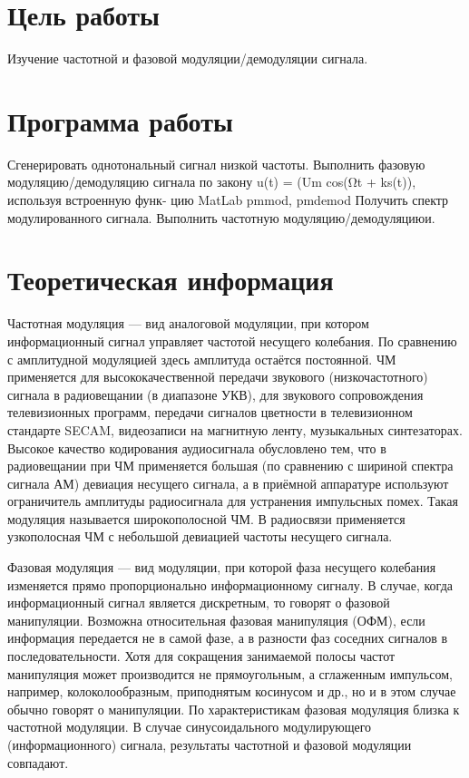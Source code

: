 







\section{Цель работы}
Изучение частотной и фазовой модуляции/демодуляции сигнала.

\section{Программа работы}
Сгенерировать однотональный сигнал низкой частоты.
Выполнить фазовую модуляцию/демодуляцию сигнала по закону u(t) = (Um cos(Ωt + ks(t)), используя встроенную функ- цию MatLab pmmod, pmdemod
Получить спектр модулированного сигнала.
Выполнить частотную модуляцию/демодуляциюи.\\


\section{Теоретическая информация}
Частотная модуляция — вид аналоговой модуляции, при котором информационный сигнал управляет частотой несущего колебания. По сравнению с амплитудной модуляцией здесь амплитуда остаётся постоянной.
ЧМ применяется для высококачественной передачи звукового (низкочастотного) сигнала в радиовещании (в диапазоне УКВ), для звукового сопровождения телевизионных программ, передачи сигналов цветности в телевизионном стандарте SECAM, видеозаписи на магнитную ленту, музыкальных синтезаторах.
Высокое качество кодирования аудиосигнала обусловлено тем, что в радиовещании при ЧМ применяется большая (по сравнению с шириной спектра сигнала АМ) девиация несущего сигнала, а в приёмной аппаратуре используют ограничитель амплитуды радиосигнала для устранения импульсных помех. Такая модуляция называется широкополосной ЧМ. В радиосвязи применяется узкополосная ЧМ с небольшой девиацией частоты несущего сигнала.

Фазовая модуляция — вид модуляции, при которой фаза несущего колебания изменяется прямо пропорционально информационному сигналу.
В случае, когда информационный сигнал является дискретным, то говорят о фазовой манипуляции. Возможна относительная фазовая манипуляция (ОФМ), если информация передается не в самой фазе, а в разности фаз соседних сигналов в последовательности. Хотя для сокращения занимаемой полосы частот манипуляция может производится не прямоугольным, а сглаженным импульсом, например, колоколообразным, приподнятым косинусом и др., но и в этом случае обычно говорят о манипуляции.
По характеристикам фазовая модуляция близка к частотной модуляции. В случае синусоидального модулирующего (информационного) сигнала, результаты частотной и фазовой модуляции совпадают.




